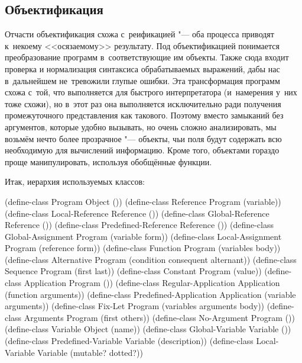 \subsection{Объектификация}\label{macros/macrosystem/ssect:object}

Отчасти объектификация схожа с~реификацией "--- оба процесса приводят к~некоему
<<осязаемому>> результату. Под объектификацией понимается преобразование
программ в~соответствующие им объекты. Также сюда входит проверка и нормализация
синтаксиса обрабатываемых выражений, дабы нас в~дальнейшем не~тревожили глупые
ошибки. Эта трансформация программ схожа с~той, что выполняется для быстрого
интерпретатора (и~намерения у~них тоже схожи), но в~этот раз она выполняется
исключительно ради получения промежуточного представления как такового. Поэтому
вместо замыканий без аргументов, которые удобно вызывать, но очень сложно
анализировать, мы возьмём нечто более прозрачное "--- объекты, чьи поля будут
содержать всю необходимую для вычислений информацию. Кроме того, объектами
гораздо проще манипулировать, используя обобщённые функции.

Итак, иерархия используемых классов:

%
%
%
%
%
%
\begin{code:lisp}
(define-class Program                Object ())
(define-class Reference              Program (variable))
(define-class Local-Reference        Reference ())
(define-class Global-Reference       Reference ())
(define-class Predefined-Reference   Reference ())
(define-class Global-Assignment      Program (variable form))
(define-class Local-Assignment       Program (reference form))
(define-class Function               Program (variables body))
(define-class Alternative Program (condition consequent alternant))
(define-class Sequence               Program (first last))
(define-class Constant               Program (value))
(define-class Application            Program ())
(define-class Regular-Application    Application (function arguments))
(define-class Predefined-Application Application (variable arguments))
(define-class Fix-Let                Program (variables arguments body))
(define-class Arguments              Program (first others))
(define-class No-Argument            Program ())
(define-class Variable               Object (name))
(define-class Global-Variable        Variable ())
(define-class Predefined-Variable    Variable (description))
(define-class Local-Variable         Variable (mutable? dotted?))
\end{code:lisp}

